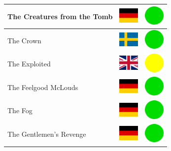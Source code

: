 \documentclass[12pt, a4paper, twoside]{report}
\begin{document}
\begin{center}
\begin{longtable}{|p{5cm}|p{2cm}|p{2cm}|}
 The Creatures from the Tomb                                & \includegraphics[width=1cm]{../img/flags/de} &   \includegraphics[width=1cm]{../likes/y} \\ \hline
 The Crown                                                  & \includegraphics[width=1cm]{../img/flags/se} &   \includegraphics[width=1cm]{../likes/y} \\ \hline
 The Exploited                                              & \includegraphics[width=1cm]{../img/flags/gb} &   \includegraphics[width=1cm]{../likes/m} \\ \hline
 The Feelgood McLouds                                       & \includegraphics[width=1cm]{../img/flags/de} &   \includegraphics[width=1cm]{../likes/y} \\ \hline
 The Fog                                                    & \includegraphics[width=1cm]{../img/flags/de} &   \includegraphics[width=1cm]{../likes/y} \\ \hline
 The Gentlemen's Revenge                                    & \includegraphics[width=1cm]{../img/flags/de} &   \includegraphics[width=1cm]{../likes/y} \\ \hline

\end{longtable}
\end{center}
\end{document}
